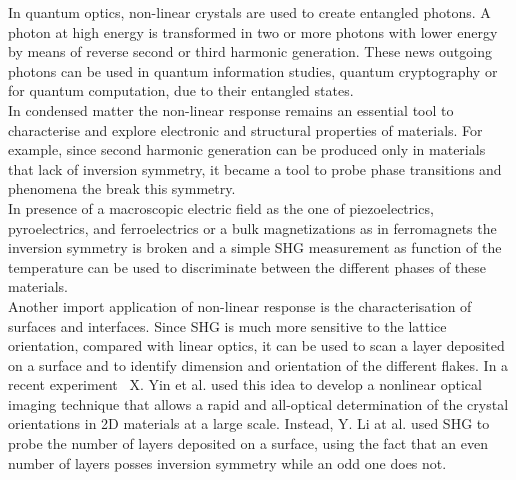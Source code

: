   
In quantum optics, non-linear crystals are used to create entangled photons. A photon at high energy is transformed in two or more photons with lower energy by means of reverse second or third harmonic generation. These news outgoing photons can be used in quantum information studies, quantum cryptography or for quantum computation, due to their entangled states.\cite{PhysRevLett.75.4337}\\ 
In condensed matter the non-linear response remains an essential tool to characterise and explore electronic and structural properties of materials. 
For example, since second harmonic generation can be produced only in materials that lack of inversion symmetry, it became a tool to probe phase transitions and phenomena the break this symmetry. \\
In presence of a macroscopic electric field as the one of piezoelectrics, pyroelectrics, and ferroelectrics or a bulk magnetizations as in ferromagnets the inversion symmetry is broken and a simple SHG measurement as function of the temperature can be used to discriminate between the different phases of these materials.\\ %
Another import application of non-linear response is the characterisation of surfaces and interfaces. Since SHG is much more sensitive to the lattice orientation, compared with linear optics, it can be used to scan a layer deposited on a surface and to identify  dimension and orientation of the different flakes. 
In a recent experiment~\cite{yin2014edge}  X. Yin et al. used this idea to develop a nonlinear optical imaging technique that allows a rapid and all-optical determination of the crystal orientations in 2D materials at a large scale. %
Instead, Y. Li at al. used SHG to probe the number of layers deposited on a surface, using the fact that an even number of layers posses inversion symmetry while an odd one does not.\cite{doi:10.1021/nl401561r}\\
